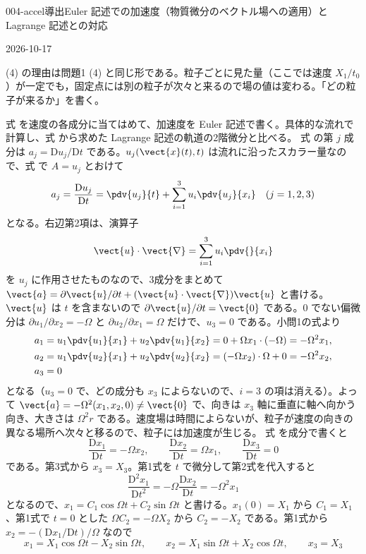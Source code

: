 \documentclass[uplatex,dvipdfmx,a4paper,11pt]{jsarticle}
\begin{document}
\begin{mondai}{004-accel}{導出}{Euler 記述での加速度（物質微分のベクトル場への適用）と Lagrange 記述との対応}
\begin{maekizuki}{2026-10-17}
\item (4) の理由は問題1 (4) と同じ形である。粒子ごとに見た量（ここでは速度 $X_{1}/t_{0}$）が一定でも，固定点には別の粒子が次々と来るので場の値は変わる。「どの粒子が来るか」を書く。
\end{maekizuki}
\begin{tadashii}
\houshin 式  を速度の各成分に当てはめて、加速度を Euler 記述で書く。具体的な流れで計算し、式  から求めた Lagrange 記述の軌道の2階微分と比べる。
\keisan {} 式  の第 $j$ 成分は $a_j = \mathrm{D}u_j/\mathrm{D}t$ である。$u_j(\vect{x}(t),t)$ は流れに沿ったスカラー量なので、式  で $A = u_j$ とおけて
\[ a_j = \frac{\mathrm{D}u_j}{\mathrm{D}t} = \pdv{u_j}{t} + \sum_{i=1}^{3} u_i\pdv{u_j}{x_i}\quad (j=1,2,3) \]
となる。右辺第2項は、演算子
\[ \vect{u}\cdot\vect{\nabla} = \sum_{i=1}^{3} u_i\pdv{}{x_i} \]
を $u_j$ に作用させたものなので、3成分をまとめて $\vect{a} = \partial\vect{u}/\partial t + (\vect{u}\cdot\vect{\nabla})\vect{u}$ と書ける。
 $\vect{u}$ は $t$ を含まないので $\partial\vect{u}/\partial t = \vect{0}$ である。0 でない偏微分は $\partial u_1/\partial x_2 = -\Omega$ と $\partial u_2/\partial x_1 = \Omega$ だけで、$u_3 = 0$ である。小問1の式より
\begin{align*}
a_1 &= u_1\pdv{u_1}{x_1} + u_2\pdv{u_1}{x_2} = 0 + \Omega x_1\cdot(-\Omega) = -\Omega^{2}x_1,\\
a_2 &= u_1\pdv{u_2}{x_1} + u_2\pdv{u_2}{x_2} = (-\Omega x_2)\cdot\Omega + 0 = -\Omega^{2}x_2,\\
a_3 &= 0
\end{align*}
となる（$u_3 = 0$ で、どの成分も $x_3$ によらないので、$i = 3$ の項は消える）。よって $\vect{a} = -\Omega^{2}(x_1, x_2, 0) \neq \vect{0}$ で、向きは $x_3$ 軸に垂直に軸へ向かう向き、大きさは $\Omega^{2}r$ である。速度場は時間によらないが、粒子が速度の向きの異なる場所へ次々と移るので、粒子には加速度が生じる。
 式  を成分で書くと
\[ \frac{\mathrm{D}x_1}{\mathrm{D}t} = -\Omega x_2,\qquad \frac{\mathrm{D}x_2}{\mathrm{D}t} = \Omega x_1,\qquad \frac{\mathrm{D}x_3}{\mathrm{D}t} = 0 \]
である。第3式から $x_3 = X_3$。第1式を $t$ で微分して第2式を代入すると
\[ \frac{\mathrm{D}^{2}x_1}{\mathrm{D}t^{2}} = -\Omega\frac{\mathrm{D}x_2}{\mathrm{D}t} = -\Omega^{2}x_1 \]
となるので、$x_1 = C_1\cos\Omega t + C_2\sin\Omega t$ と書ける。$x_1(0) = X_1$ から $C_1 = X_1$、第1式で $t = 0$ とした $\Omega C_2 = -\Omega X_2$ から $C_2 = -X_2$ である。第1式から $x_2 = -(\mathrm{D}x_1/\mathrm{D}t)/\Omega$ なので
\[ x_1 = X_1\cos\Omega t - X_2\sin\Omega t,\qquad x_2 = X_1\sin\Omega t + X_2\cos\Omega t,\qquad x_3 = X_3 \]

\end{tadashii}
\end{mondai}
\end{document}
